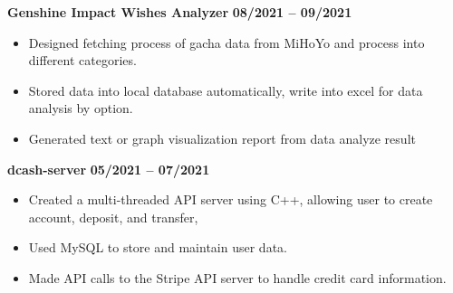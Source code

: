 \documentclass[margin,line]{res}
\begin{document}
\begin{resume}
{\bf Genshine Impact Wishes Analyzer} \hfill {\bf 08/2021 -- 09/2021} \\
\vspace{-.3cm}
\begin{itemize}
	\item Designed fetching process of gacha data from MiHoYo and process into different categories.
	\item Stored data into local database automatically, write into excel for data analysis by option.
	\item Generated text or graph visualization report from data analyze result
\end{itemize}
\vspace{-.3cm}

{\bf dcash-server} \hfill {\bf 05/2021 -- 07/2021} \\
\vspace{-.3cm}
\begin{itemize}
	\item Created a multi-threaded API server using C++, allowing user to create account, deposit, and transfer,
	\item Used MySQL to store and maintain user data.
	\item Made API calls to the Stripe API server to handle credit card information.
\end{itemize}
\vspace{-.3cm}


\end{resume}
\end{document}
